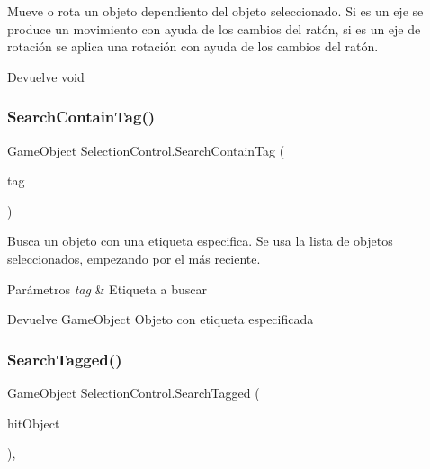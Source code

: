 Mueve o rota un objeto dependiento del objeto seleccionado. Si es un eje se produce un movimiento con ayuda de los cambios del ratón, si es un eje de rotación se aplica una rotación con ayuda de los cambios del ratón. \begin{DoxyReturn}{Devuelve}
void 
\end{DoxyReturn}
\mbox{\label{class_selection_control_a8e92014a9781e84be7079f4dfd96caf9}} 
\subsubsection{\texorpdfstring{SearchContainTag()}{SearchContainTag()}}
{\footnotesize\ttfamily Game\+Object Selection\+Control.\+Search\+Contain\+Tag (\begin{DoxyParamCaption}\item[{string}]{tag }\end{DoxyParamCaption})\hspace{0.3cm}{\ttfamily [inline]}}

Busca un objeto con una etiqueta especifica. Se usa la lista de objetos seleccionados, empezando por el más reciente. 
\begin{DoxyParams}{Parámetros}
{\em tag} & Etiqueta a buscar \\
\hline
\end{DoxyParams}
\begin{DoxyReturn}{Devuelve}
Game\+Object Objeto con etiqueta especificada 
\end{DoxyReturn}
\mbox{\label{class_selection_control_af43fca6b87eee0f60bc8bb79f987d42c}} 
\subsubsection{\texorpdfstring{SearchTagged()}{SearchTagged()}}
{\footnotesize\ttfamily Game\+Object Selection\+Control.\+Search\+Tagged (\begin{DoxyParamCaption}\item[{Game\+Object}]{hit\+Object }\end{DoxyParamCaption})\hspace{0.3cm}{\ttfamily [inline]}, {\ttfamily [private]}}

